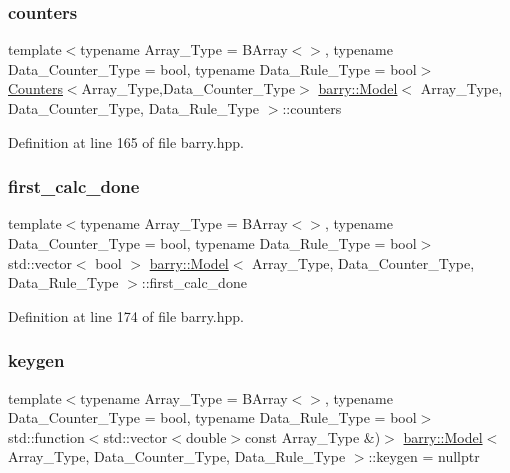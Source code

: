 \subsubsection{\texorpdfstring{counters}{counters}}
{\footnotesize\ttfamily template$<$typename Array\+\_\+\+Type  = B\+Array$<$$>$, typename Data\+\_\+\+Counter\+\_\+\+Type  = bool, typename Data\+\_\+\+Rule\+\_\+\+Type  = bool$>$ \\
\hyperlink{classbarry_1_1_counters}{Counters}$<$Array\+\_\+\+Type,Data\+\_\+\+Counter\+\_\+\+Type$>$ \hyperlink{classbarry_1_1_model}{barry\+::\+Model}$<$ Array\+\_\+\+Type, Data\+\_\+\+Counter\+\_\+\+Type, Data\+\_\+\+Rule\+\_\+\+Type $>$\+::counters}



Definition at line 165 of file barry.\+hpp.

\mbox{\label{classbarry_1_1_model_ae7b6def02fcb353830362713490c9825}} 
\subsubsection{\texorpdfstring{first\+\_\+calc\+\_\+done}{first\_calc\_done}}
{\footnotesize\ttfamily template$<$typename Array\+\_\+\+Type  = B\+Array$<$$>$, typename Data\+\_\+\+Counter\+\_\+\+Type  = bool, typename Data\+\_\+\+Rule\+\_\+\+Type  = bool$>$ \\
std\+::vector$<$ bool $>$ \hyperlink{classbarry_1_1_model}{barry\+::\+Model}$<$ Array\+\_\+\+Type, Data\+\_\+\+Counter\+\_\+\+Type, Data\+\_\+\+Rule\+\_\+\+Type $>$\+::first\+\_\+calc\+\_\+done}



Definition at line 174 of file barry.\+hpp.

\mbox{\label{classbarry_1_1_model_a68f7422006423a4f0a00c3e4f5d0e1d5}} 
\subsubsection{\texorpdfstring{keygen}{keygen}}
{\footnotesize\ttfamily template$<$typename Array\+\_\+\+Type  = B\+Array$<$$>$, typename Data\+\_\+\+Counter\+\_\+\+Type  = bool, typename Data\+\_\+\+Rule\+\_\+\+Type  = bool$>$ \\
std\+::function$<$std\+::vector$<$double$>$const Array\+\_\+\+Type \&)$>$ \hyperlink{classbarry_1_1_model}{barry\+::\+Model}$<$ Array\+\_\+\+Type, Data\+\_\+\+Counter\+\_\+\+Type, Data\+\_\+\+Rule\+\_\+\+Type $>$\+::keygen = nullptr}



